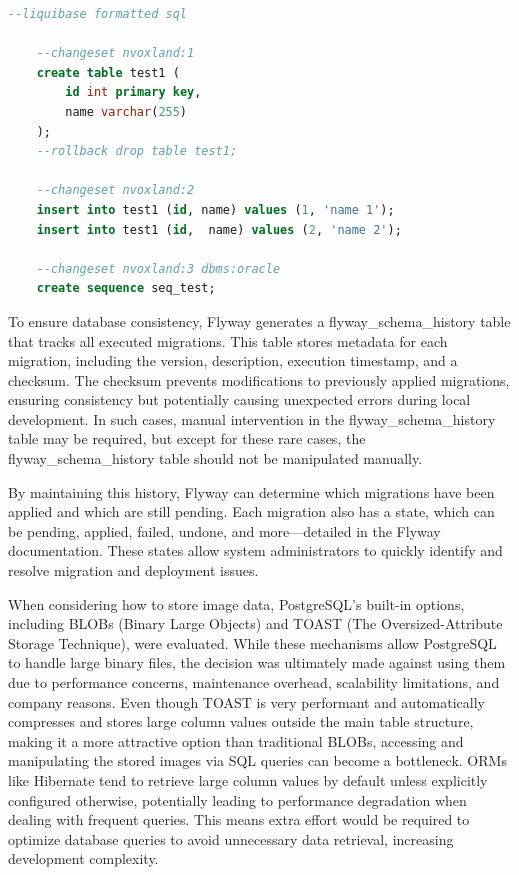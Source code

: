 \begin{lstlisting}[language=Sql,caption=Liquibase example changelog,label=lst:liquibase:example]
    --liquibase formatted sql
    
    --changeset nvoxland:1
    create table test1 (  
        id int primary key,
        name varchar(255)  
    );  
    --rollback drop table test1; 
    
    --changeset nvoxland:2 
    insert into test1 (id, name) values (1, 'name 1');
    insert into test1 (id,  name) values (2, 'name 2');  
    
    --changeset nvoxland:3 dbms:oracle
    create sequence seq_test;
\end{lstlisting}
    
To ensure database consistency, Flyway generates a flyway\_schema\_history table that tracks all executed migrations. This table stores metadata for each migration, including the version, description, execution timestamp, and a checksum. The checksum prevents modifications to previously applied migrations, ensuring consistency but potentially causing unexpected errors during local development. In such cases, manual intervention in the flyway\_schema\_history table may be required, but except for these rare cases, the flyway\_schema\_history table should not be manipulated manually.

By maintaining this history, Flyway can determine which migrations have been applied and which are still pending. Each migration also has a state, which can be pending, applied, failed, undone, and more—detailed in the Flyway documentation. These states allow system administrators to quickly identify and resolve migration and deployment issues.

When considering how to store image data, PostgreSQL’s built-in options, including BLOBs (Binary Large Objects) and TOAST \cite{PostgreSQLDocs} (The Oversized-Attribute Storage Technique), were evaluated. While these mechanisms allow PostgreSQL to handle large binary files, the decision was ultimately made against using them due to performance concerns, maintenance overhead, scalability limitations, and company reasons.
Even though TOAST is very performant and automatically compresses and stores large column values outside the main table structure, making it a more attractive option than traditional BLOBs, accessing and manipulating the stored images via SQL queries can become a bottleneck. ORMs like Hibernate tend to retrieve large column values by default unless explicitly configured otherwise, potentially leading to performance degradation when dealing with frequent queries. This means extra effort would be required to optimize database queries to avoid unnecessary data retrieval, increasing development complexity.


